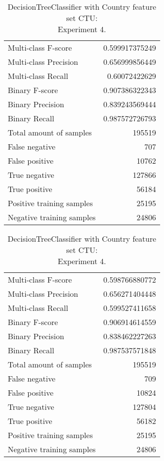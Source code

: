 \begin{table}[H]
\begin{minipage}{0.5\textwidth}
\caption{DecisionTreeClassifier with Country feature set CTU: \\Experiment 3.}
\centering
\begin{tabular}{l r}
\toprule
Multi-class F-score & 0.599917375249 \\
Multi-class Precision & 0.656999856449 \\
Multi-class Recall & 0.60072422629 \\
\midrule
Binary F-score & 0.907386322343 \\
Binary Precision & 0.839243569444 \\
Binary Recall & 0.987572726793 \\
\midrule
Total amount of samples & 195519 \\
False negative & 707 \\
False positive & 10762 \\
True negative & 127866 \\
True positive & 56184 \\
\midrule
Positive training samples & 25195 \\
Negative training samples & 24806 \\
\bottomrule
\end{tabular}
\end{minipage}
\hfillx
\begin{minipage}{0.5\textwidth}
\caption{DecisionTreeClassifier with Country feature set CTU: \\Experiment 4.}
\centering
\begin{tabular}{l r}
\toprule
Multi-class F-score & 0.598766880772 \\
Multi-class Precision & 0.656271404448 \\
Multi-class Recall & 0.599527411658 \\
\midrule
Binary F-score & 0.906914614559 \\
Binary Precision & 0.838462227263 \\
Binary Recall & 0.987537571848 \\
\midrule
Total amount of samples & 195519 \\
False negative & 709 \\
False positive & 10824 \\
True negative & 127804 \\
True positive & 56182 \\
\midrule
Positive training samples & 25195 \\
Negative training samples & 24806 \\
\bottomrule
\end{tabular}
\end{minipage}
\end{table}

